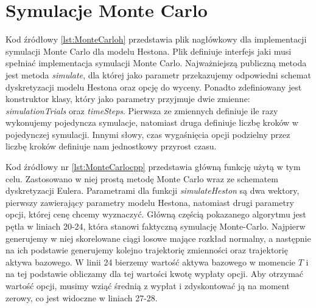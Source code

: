 \documentclass{pracamgr}
\begin{document}
\clearpage
\section{Symulacje Monte Carlo}
Kod źródłowy \ref{lst:MonteCarloh} przedstawia plik nagłówkowy dla implementacji symulacji 
Monte Carlo dla modelu Hestona. Plik definiuje interfejs jaki musi spełniać
implementacja symulacji Monte Carlo. Najważniejszą publiczną metoda jest metoda \textit{simulate}, 
dla której jako parametr przekazujemy odpowiedni schemat dyskretyzacji modelu Hestona 
oraz opcję do wyceny. 
Ponadto zdefiniowany jest konstruktor klasy, który jako parametry przyjmuje dwie zmienne:
\textit{simulationTrials} oraz \textit{timeSteps}.
Pierwsza ze zmiennych definiuje ile razy wykonujemy pojedyncza symulacje, natomiast druga 
definiuje liczbę kroków w pojedynczej symulacji. Innymi słowy, czas wygaśnięcia opcji 
podzielny przez liczbę kroków definiuje nam jednostkowy przyrost czasu.
Kod źródłowy nr \ref{lst:MonteCarlocpp} przedstawia główną funkcję użytą w tym celu. 
Zastosowano w niej prostą metodę Monte Carlo wraz ze schematem dyskretyzacji Eulera. 
Parametrami dla funkcji \textit{simulateHeston} są dwa wektory, pierwszy zawierający
parametry modelu Hestona, natomiast drugi parametry opcji, której cenę chcemy wyznaczyć. 
Główną częścią pokazanego algorytmu jest pętla w liniach 20-24, która stanowi faktyczną symulację
Monte-Carlo. Najpierw generujemy w niej skorelowane ciągi losowe mające rozkład normalny, 
a następnie na ich podstawie generujemy kolejno trajektorię zmienności oraz trajektorię aktywa
bazowego. W linii 24 bierzemy wartość aktywa bazowego w momencie $T$ i na tej podstawie obliczamy dla
tej wartości kwotę wypłaty opcji. Aby otrzymać wartość opcji, musimy wziąć średnią z wypłat i
zdyskontować ją na moment zerowy, co jest widoczne w liniach 27-28.

\end{document}
